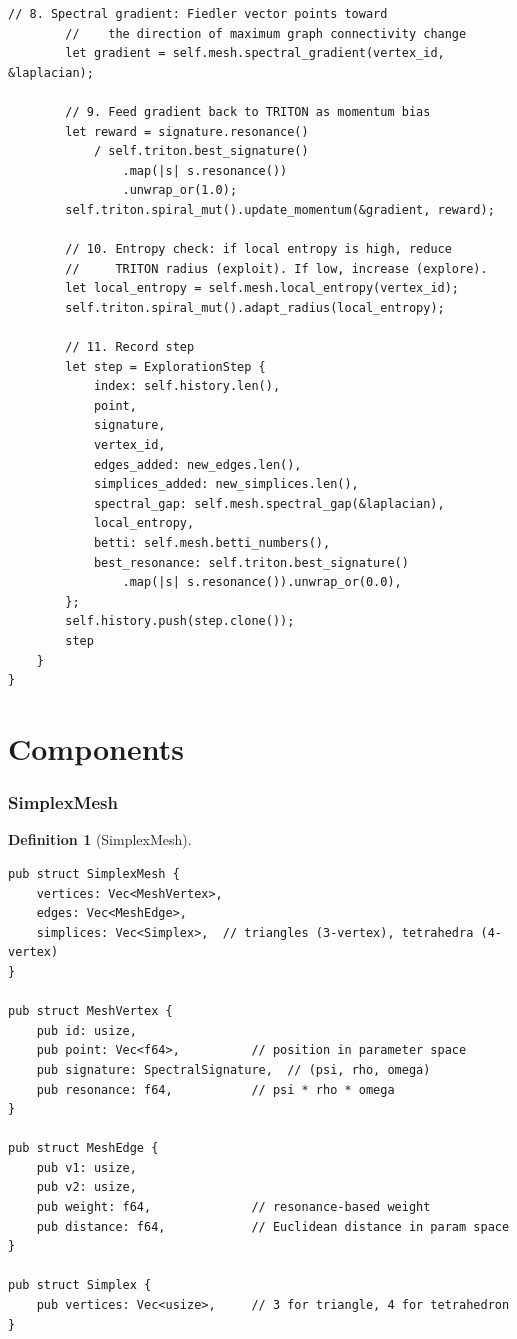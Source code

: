 \documentclass[11pt,a4paper,twoside]{article}
\theoremstyle{definition}
\newtheorem{definition}{Definition}[section]
\theoremstyle{plain}
\theoremstyle{remark}
\begin{document}
\begin{lstlisting}[title={The complete loop}]
        // 8. Spectral gradient: Fiedler vector points toward
        //    the direction of maximum graph connectivity change
        let gradient = self.mesh.spectral_gradient(vertex_id, &laplacian);

        // 9. Feed gradient back to TRITON as momentum bias
        let reward = signature.resonance()
            / self.triton.best_signature()
                .map(|s| s.resonance())
                .unwrap_or(1.0);
        self.triton.spiral_mut().update_momentum(&gradient, reward);

        // 10. Entropy check: if local entropy is high, reduce
        //     TRITON radius (exploit). If low, increase (explore).
        let local_entropy = self.mesh.local_entropy(vertex_id);
        self.triton.spiral_mut().adapt_radius(local_entropy);

        // 11. Record step
        let step = ExplorationStep {
            index: self.history.len(),
            point,
            signature,
            vertex_id,
            edges_added: new_edges.len(),
            simplices_added: new_simplices.len(),
            spectral_gap: self.mesh.spectral_gap(&laplacian),
            local_entropy,
            betti: self.mesh.betti_numbers(),
            best_resonance: self.triton.best_signature()
                .map(|s| s.resonance()).unwrap_or(0.0),
        };
        self.history.push(step.clone());
        step
    }
}
\end{lstlisting}


\part{Components}\label{part:components}

\section{SimplexMesh}\label{sec:mesh}

\begin{definition}[SimplexMesh]\label{def:mesh}
\begin{lstlisting}
pub struct SimplexMesh {
    vertices: Vec<MeshVertex>,
    edges: Vec<MeshEdge>,
    simplices: Vec<Simplex>,  // triangles (3-vertex), tetrahedra (4-vertex)
}

pub struct MeshVertex {
    pub id: usize,
    pub point: Vec<f64>,          // position in parameter space
    pub signature: SpectralSignature,  // (psi, rho, omega)
    pub resonance: f64,           // psi * rho * omega
}

pub struct MeshEdge {
    pub v1: usize,
    pub v2: usize,
    pub weight: f64,              // resonance-based weight
    pub distance: f64,            // Euclidean distance in param space
}

pub struct Simplex {
    pub vertices: Vec<usize>,     // 3 for triangle, 4 for tetrahedron
}
\end{lstlisting}
\end{definition}
\end{document}
